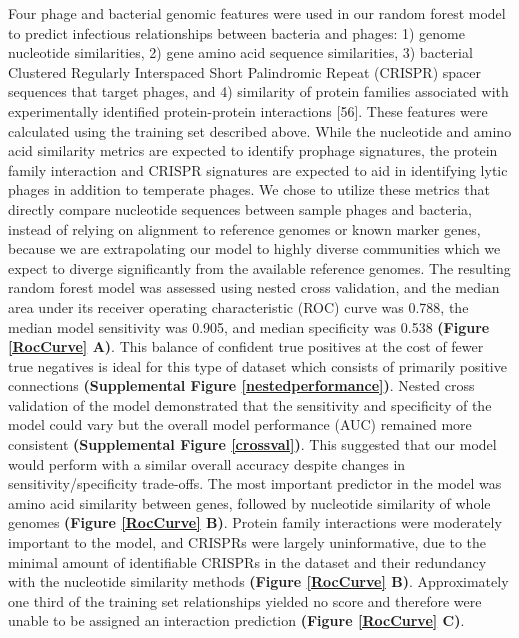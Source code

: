 \documentclass[12pt,]{article}
\begin{document}
Four phage and bacterial genomic features were used in our random forest
model to predict infectious relationships between bacteria and phages:
1) genome nucleotide similarities, 2) gene amino acid sequence
similarities, 3) bacterial Clustered Regularly Interspaced Short
Palindromic Repeat (CRISPR) spacer sequences that target phages, and 4)
similarity of protein families associated with experimentally identified
protein-protein interactions {[}56{]}. These features were calculated
using the training set described above. While the nucleotide and amino
acid similarity metrics are expected to identify prophage signatures,
the protein family interaction and CRISPR signatures are expected to aid
in identifying lytic phages in addition to temperate phages. We chose to
utilize these metrics that directly compare nucleotide sequences between
sample phages and bacteria, instead of relying on alignment to reference
genomes or known marker genes, because we are extrapolating our model to
highly diverse communities which we expect to diverge significantly from
the available reference genomes. The resulting random forest model was
assessed using nested cross validation, and the median area under its
receiver operating characteristic (ROC) curve was 0.788, the median
model sensitivity was 0.905, and median specificity was 0.538
\textbf{(Figure \ref{RocCurve} A)}. This balance of confident true
positives at the cost of fewer true negatives is ideal for this type of
dataset which consists of primarily positive connections
\textbf{(Supplemental Figure \ref{nestedperformance})}. Nested cross
validation of the model demonstrated that the sensitivity and
specificity of the model could vary but the overall model performance
(AUC) remained more consistent \textbf{(Supplemental Figure
\ref{crossval})}. This suggested that our model would perform with a
similar overall accuracy despite changes in sensitivity/specificity
trade-offs. The most important predictor in the model was amino acid
similarity between genes, followed by nucleotide similarity of whole
genomes \textbf{(Figure \ref{RocCurve} B)}. Protein family interactions
were moderately important to the model, and CRISPRs were largely
uninformative, due to the minimal amount of identifiable CRISPRs in the
dataset and their redundancy with the nucleotide similarity methods
\textbf{(Figure \ref{RocCurve} B)}. Approximately one third of the
training set relationships yielded no score and therefore were unable to
be assigned an interaction prediction \textbf{(Figure \ref{RocCurve}
C)}.
\end{document}
